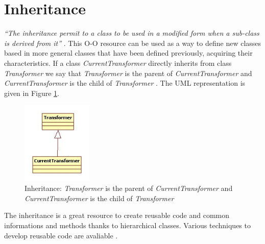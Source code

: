 \section{Inheritance}
 
\emph{
	``The inheritance permit to a class to be 
	used in a modified form when a sub-class 
	is derived from it''
} \cite{Capretz:2003}. This O-O resource 
can be used as a way to define new
classes based in more general classes 
that have been 
defined previously, acquiring their characteristics.  
If a class \emph{CurrentTransformer} directly 
inherits from class \emph{Transformer} we say that 
\emph{Transformer} is the parent 
of \emph{CurrentTransformer} and 
\emph{CurrentTransformer} is the 
child of \emph{Transformer} \cite{Snyder:1986}. 
The UML representation is given in 
Figure \ref{fig:inheritance-fig}.

\begin{figure}
  \includegraphics[width=0.3\textwidth]{chapters/ch-oop/figures/inheritance}
  \caption{
  		Inheritance: \emph{Transformer} is the parent 
		of \emph{CurrentTransformer} and 
		\emph{CurrentTransformer} is the 
		child of \emph{Transformer}
		}
  \label{fig:inheritance-fig}
\end{figure}

The inheritance is a great resource to create 
reusable code and common informations and methods 
thanks to hierarchical classes. 
Various techniques to develop reusable code are 
avaliable 
\cite{Johnson:1988} 
\cite{Micallef:1988}
\cite{Gossain:1990} 
\cite{Capretz:1992}.  
